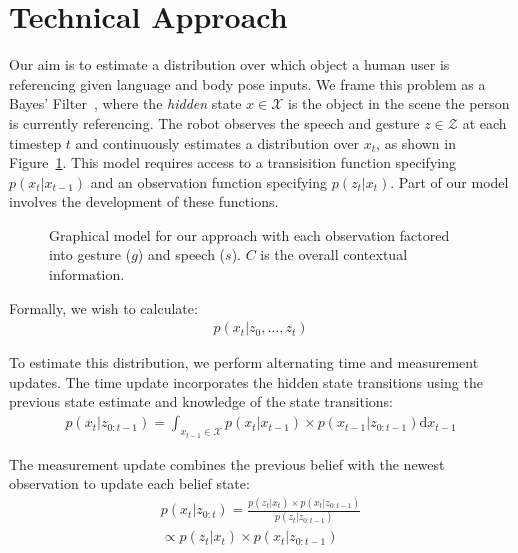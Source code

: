 \documentclass[a4paper, 11pt]{article} %
\begin{document}
\section{Technical Approach}
Our aim is to estimate a distribution over which object a human user is referencing given language and body pose inputs. We frame this problem as a Bayes' Filter~\citep{thrun08}, where the \textit{hidden} state $x \in \mathcal{X}$ is the object in the scene the person is currently referencing. The robot observes the speech and gesture $z \in \mathcal{Z}$ at each timestep $t$ and continuously estimates a distribution over $x_t$, as shown in Figure~\ref{fig:model}. This model requires access to a transisition function specifying $p(x_t | x_{t-1})$ and an observation function specifying $p(z_t | x_t)$. Part of our model involves the development of these functions.

\begin{figure}[h]
\centering
{}
\caption{Graphical model for our approach with each observation factored into gesture ($g$) and speech ($s$). $C$ is the overall contextual information.\label{fig:model}}
\end{figure}

Formally, we wish to calculate:
\begin{align}
p(x_t | z_0, \dots, z_t)
\end{align}

To estimate this distribution, we perform alternating time and measurement updates. The time update incorporates the hidden state transitions using the previous state estimate and knowledge of the state transitions:
\begin{align}
p(x_t | z_{0:t-1}) = \int_{x_{t-1} \in \mathcal{X}} p(x_t|x_{t-1})\times p(x_{t-1} | z_{0:t-1}) \text{d}x_{t-1}
\end{align}

The measurement update combines the previous belief with the newest observation to update each belief state: 
\begin{align}
p(x_t |z_{0:t}) = \frac{p(z_t | x_t) \times p(x_t | z_{0:t-1})}{p(z_t | z_{0:t-1})} \\\propto p(z_t | x_t) \times p(x_t | z_{0:t-1})
\end{align}
\end{document}
